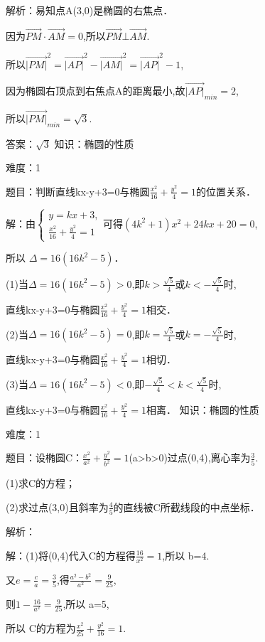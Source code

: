 \documentclass{article} %
\begin{document}
解析：易知点A(3,0)是椭圆的右焦点．

因为$\overrightarrow{PM}\cdot \overrightarrow{AM}=0$,所以$\overrightarrow{PM}\bot \overrightarrow{AM}$.

所以$\overrightarrow{|PM|}^2=\overrightarrow{|AP|}^2-\overrightarrow{|AM|}^2=\overrightarrow{|AP|}^2-1$,

因为椭圆右顶点到右焦点A的距离最小,故$\overrightarrow{|AP|}_{min}=2$,

所以$\overrightarrow{|PM|}_{min}=\sqrt{3}$.

答案：$\sqrt{3}$
知识：椭圆的性质

难度：1

题目：判断直线kx-y+3=0与椭圆$\frac{x^2}{16}+\frac{y^2}{4}=1$的位置关系．

解：由$\left\{
\begin{array}{l}
y=kx+3, \\
\frac{x^2}{16}+\frac{y^2}{4}=1
\end{array}
\right.$可得$(4k^{2}+1)x^{2}+24kx+20=0$,

所以 $\Delta=16(16k^{2}-5)$．

(1)当$\Delta=16(16k^{2}-5)>0$,即$k>\frac{\sqrt{5}}{4}$或$k<-\frac{\sqrt{5}}{4}$时,

直线kx-y+3=0与椭圆$\frac{x^2}{16}+\frac{y^2}{4}=1$相交．

(2)当$\Delta=16(16k^{2}-5)=0$,即$k=\frac{\sqrt{5}}{4}$或$k=-\frac{\sqrt{5}}{4}$时,

直线kx-y+3=0与椭圆$\frac{x^2}{16}+\frac{y^2}{4}=1$相切．

(3)当$\Delta=16(16k^{2}-5)<0$,即$-\frac{\sqrt{5}}{4}<k<\frac{\sqrt{5}}{4}$时,

直线kx-y+3=0与椭圆$\frac{x^2}{16}+\frac{y^2}{4}=1$相离．
知识：椭圆的性质

难度：1

题目：设椭圆C：$\frac{x^2}{a^2}+\frac{y^2}{b^2}=1$(a>b>0)过点(0,4),离心率为$\frac{3}{5}$.

(1)求C的方程；

(2)求过点(3,0)且斜率为$\frac{4}{5}$的直线被C所截线段的中点坐标．

解析：

解：(1)将(0,4)代入C的方程得$\frac{16}{x^2}=1$,所以 b=4.

又$e=\frac{c}{a}=\frac{3}{5}$,得$\frac{a^2-b^2}{a^2}=\frac{9}{25}$,

则$1-\frac{16}{a^2}=\frac{9}{25}$,所以 a=5,

所以 C的方程为$\frac{x^2}{25}+\frac{y^2}{16}=1$.
\end{document}

